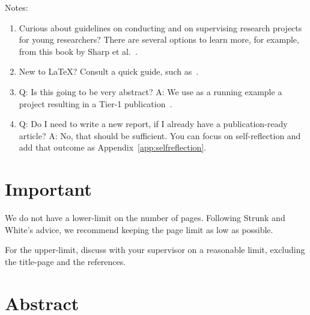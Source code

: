 \documentclass[11pt]{article}
\begin{document}
\newpage

Notes:
\begin{enumerate}

    \item Curious about guidelines on conducting and on supervising research projects for young researchers? %
    There are several options to learn more, for example, from this book by Sharp et al.~\cite{research:book/SharpPW02}.

    \item New to \LaTeX{}? Consult a quick guide, such as~\cite{techrep:latex,techblog:latex}.
    
    \item Q: Is this going to be very abstract? A: We use as a running example a project resulting in a Tier-1 publication~\cite{DBLP:conf/sc/AndreadisVMI18}. 
    
    \item Q: Do I need to write a new report, if I already have a publication-ready article? A: No, that should be sufficient. You can focus on self-reflection and add that outcome as Appendix~\ref{app:selfreflection}.
    
\end{enumerate}


\section*{Important}

We do not have a lower-limit on the number of pages. Following Strunk and White's advice, we recommend keeping the page limit as low as possible. 

For the upper-limit, discuss with your supervisor on a reasonable limit, excluding the title-page and the references.




\section*{Abstract}
\end{document}

